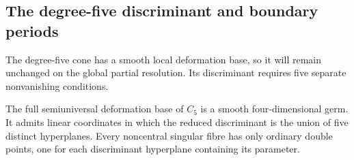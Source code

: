 \subsection{The degree-five discriminant and boundary periods}\label{sec03:degree5}

The degree-five cone has a smooth local deformation base, so it will
remain unchanged on the global partial resolution.  Its discriminant
requires five separate nonvanishing conditions.

\begin{proposition}\label{prop03:degree5family}
The full semiuniversal deformation base of $C_5$ is a smooth
four-dimensional germ.  It admits linear coordinates in which the
reduced discriminant is the union of five distinct hyperplanes.
Every noncentral singular fibre has only ordinary double points,
one for each discriminant hyperplane containing its parameter.
\end{proposition}

